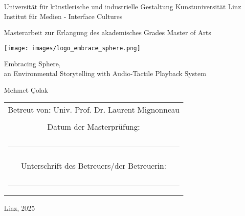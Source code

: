 \begin{titlepage}
    \centering

    {\large
    Universität für künstlerische und industrielle Gestaltung Kunstuniversität Linz\\
    Institut für Medien - Interface Cultures}
    
    \vspace{0.2cm}

    {\large Masterarbeit zur Erlangung des akademisches Grades Master of Arts\\}

    \vspace{0.5cm}

    \texttt{[image: images/logo\_embrace\_sphere.png]}
    
    {\Huge Embracing Sphere,}\\[0.5cm]
    {\Large an Environmental Storytelling with Audio-Tactile Playback System}

    \vspace{0.5cm}

    {\LARGE Mehmet Çolak}

    \vfill

    \begin{tabular}{c}
        \Large Betreut von: Univ. Prof. Dr. Laurent Mignonneau \\ \\
        \large Datum der Masterprüfung: \\ \\
        \rule{3cm}{0.1pt} \\ \\
        \large Unterschrift des Betreuers/der Betreuerin: \\ \\
        \rule{3cm}{0.1pt} \\
    \end{tabular}
    
    \vspace{1cm}
    
    {\small Linz, 2025}

\end{titlepage}